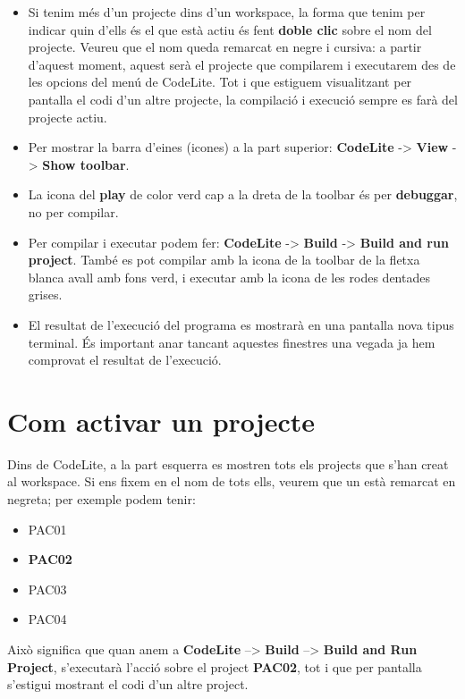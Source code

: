 \documentclass[]{book}
\providecommand{\tightlist}{%
  \setlength{\itemsep}{0pt}\setlength{\parskip}{0pt}}
\begin{document}
\begin{itemize}
\item
  Si tenim més d'un projecte dins d'un workspace, la forma que tenim per
  indicar quin d'ells és el que està actiu és fent \textbf{doble clic}
  sobre el nom del projecte. Veureu que el nom queda remarcat en negre i
  cursiva: a partir d'aquest moment, aquest serà el projecte que
  compilarem i executarem des de les opcions del menú de CodeLite. Tot i
  que estiguem visualitzant per pantalla el codi d'un altre projecte, la
  compilació i execució sempre es farà del projecte actiu.
\item
  Per mostrar la barra d'eines (icones) a la part superior:
  \textbf{CodeLite} -\textgreater{} \textbf{View} -\textgreater{}
  \textbf{Show toolbar}.
\item
  La icona del \textbf{play} de color verd cap a la dreta de la toolbar
  és per \textbf{debuggar}, no per compilar.
\item
  Per compilar i executar podem fer: \textbf{CodeLite} -\textgreater{}
  \textbf{Build} -\textgreater{} \textbf{Build and run project}. També
  es pot compilar amb la icona de la toolbar de la fletxa blanca avall
  amb fons verd, i executar amb la icona de les rodes dentades grises.
\item
  El resultat de l'execució del programa es mostrarà en una pantalla
  nova tipus terminal. És important anar tancant aquestes finestres una
  vegada ja hem comprovat el resultat de l'execució.
\end{itemize}

\section{Com activar un projecte}\label{com-activar-un-projecte}

Dins de CodeLite, a la part esquerra es mostren tots els projects que
s'han creat al workspace. Si ens fixem en el nom de tots ells, veurem
que un està remarcat en negreta; per exemple podem tenir:

\begin{itemize}
\tightlist
\item
  PAC01
\item
  \textbf{PAC02}
\item
  PAC03
\item
  PAC04
\end{itemize}

Això significa que quan anem a \textbf{CodeLite} --\textgreater{}
\textbf{Build} --\textgreater{} \textbf{Build and Run Project},
s'executarà l'acció sobre el project \textbf{PAC02}, tot i que per
pantalla s'estigui mostrant el codi d'un altre project.
\end{document}
